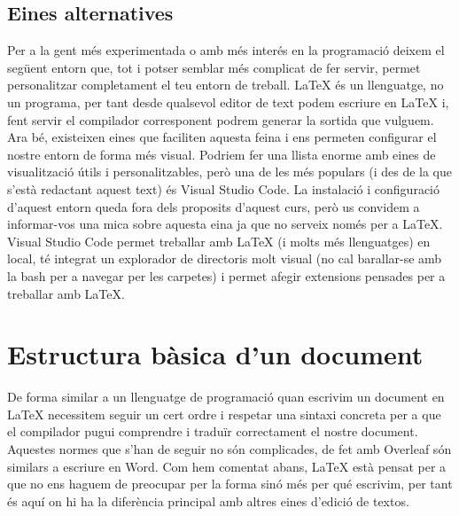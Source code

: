 \documentclass[12pm,oneside,onecolumn,openany]{book}
\begin{document}
\subsection{Eines alternatives}
Per a la gent més experimentada o amb més interés en la programació deixem el següent entorn que, tot i potser semblar més complicat de fer servir, permet personalitzar completament el teu entorn de treball. LaTeX és un llenguatge, no un programa, per tant desde qualsevol editor de text podem escriure en LaTeX i, fent servir el compilador corresponent podrem generar la sortida que vulguem. Ara bé, existeixen eines que faciliten aquesta feina i ens permeten configurar el nostre entorn de forma més visual. Podriem fer una llista enorme amb eines de visualització útils i personalitzables, però una de les més populars (i des de la que s'està redactant aquest text) és Visual Studio Code. La instalació i configuració d'aquest entorn queda fora dels proposits d'aquest curs, però us convidem a informar-vos una mica sobre aquesta eina ja que no serveix només per a LaTeX. Visual Studio Code permet treballar amb LaTeX (i molts més llenguatges) en local, té integrat un explorador de directoris molt visual (no cal barallar-se amb la bash per a navegar per les carpetes) i permet afegir extensions pensades per a treballar amb LaTeX.
\section{Estructura bàsica d'un document}
De forma similar a un llenguatge de programació quan escrivim un document en LaTeX necessitem seguir un cert ordre i respetar una sintaxi concreta per a que el compilador pugui comprendre i traduïr correctament el nostre document. Aquestes normes que s'han de seguir no són complicades, de fet amb Overleaf són similars a escriure en Word. Com hem comentat abans, LaTeX està pensat per a que no ens haguem de preocupar per la forma sinó més per qué escrivim, per tant és aquí on hi ha la diferència principal amb altres eines d'edició de textos. 
\end{document}
